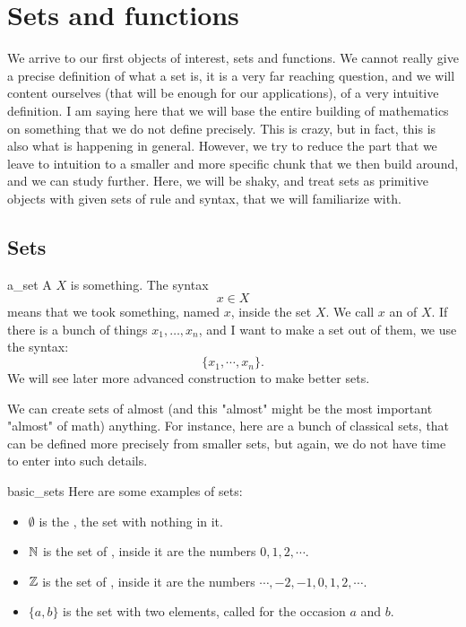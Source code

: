 \section{Sets and functions}

We arrive to our first objects of interest, sets and functions. We cannot really give a precise definition of what a set is, it is a very far reaching question, and we will content ourselves (that will be enough for our applications), of a very intuitive definition. I am saying here that we will base the entire building of mathematics on something that we do not define precisely. This is crazy, but in fact, this is also what is happening in general. However, we try to reduce the part that we leave to intuition to a smaller and more specific chunk that we then build around, and we can study further. Here, we will be shaky, and treat sets as primitive objects with given sets of rule and syntax, that we will familiarize with.

\subsection{Sets}

\begin{cdef}{}{a_set}
    A  \( X \) is something. The syntax
    \begin{equation*}
        x \in X
    \end{equation*}
    means that we took something, named \( x \), inside the set \( X \). We call \( x \) an  of \( X \). If there is a bunch of things \( x_1, \dots, x_n \), and I want to make a set out of them, we use the syntax:
    \begin{equation*}
        \{ x_1, \cdots, x_n \}.
    \end{equation*}
    We will see later more advanced construction to make better sets.
\end{cdef}

We can create sets of almost (and this "almost" might be the most important "almost" of math) anything. For instance, here are a bunch of classical sets, that can be defined more precisely from smaller sets, but again, we do not have time to enter into such details.

\begin{cexp}{}{basic_sets}
    Here are some examples of sets:
    \begin{itemize}
        \item \( \emptyset \) is the , the set with nothing in it. 
        \item \( \mathbb{N} \) is the set of , inside it are the numbers \( 0, 1, 2, \cdots \).
        \item \( \mathbb{Z} \) is the set of , inside it are the numbers \( \cdots, -2, -1, 0, 1, 2, \cdots \).
        \item \( \{ a, b \} \) is the set with two elements, called for the occasion \( a \) and \( b \).
    \end{itemize}
\end{cexp}

